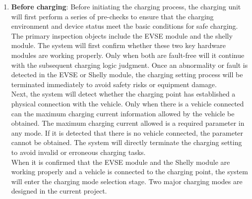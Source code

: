 \documentclass[
english,
ruledheaders=section,%
class=report,%
thesis={type=Report},%
accentcolor=9c,%
custommargins=true,%
marginpar=false,%
parskip=half-,%
fontsize=11pt,%
logofile={img/tuda_logo.pdf}, %
]{tudapub}
\begin{document}
    \begin{enumerate}[label=\Alph*.]

        \item \textbf{Before charging}:
        \label{item:beforeCharging}
        Before initiating the charging process, the charging unit will first perform a series of pre-checks to ensure that the charging environment and device status meet the basic conditions for safe charging. The primary inspection objects include the EVSE module and the shelly module. The system will first confirm whether these two key hardware modules are working properly. Only when both are fault-free will it continue with the subsequent charging logic judgment. Once an abnormality or fault is detected in the EVSE or Shelly module, the charging setting process will be terminated immediately to avoid safety risks or equipment damage. \\
        Next, the system will detect whether the charging point has established a physical connection with the vehicle. Only when there is a vehicle connected can the maximum charging current information allowed by the vehicle be obtained. The maximum charging current allowed is a required parameter in any mode. If it is detected that there is no vehicle connected, the parameter cannot be obtained. The system will directly terminate the charging setting to avoid invalid or erroneous charging tasks. \\
        When it is confirmed that the EVSE module and the Shelly module are working properly and a vehicle is connected to the charging point, the system will enter the charging mode selection stage. Two major charging modes are designed in the current project.



\end{enumerate}
\end{document}
